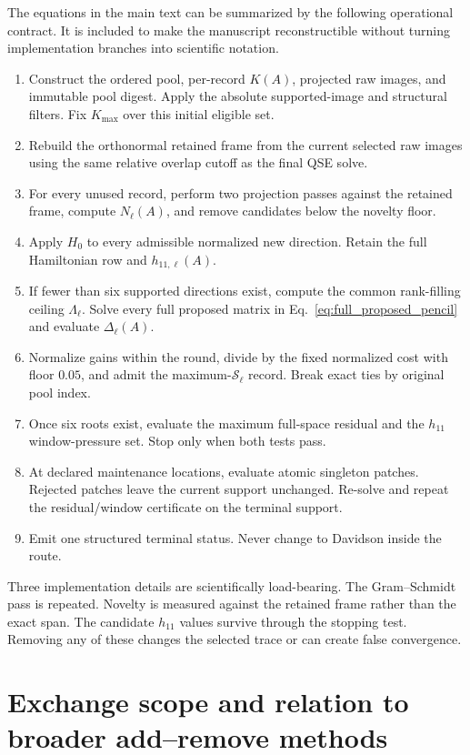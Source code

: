 \documentclass[
  reprint,
  amsmath,
  amssymb,
  aps,
  pra,
  nofootinbib,
  superscriptaddress,
  floatfix
]{revtex4-2}
\newcommand{\score}{\mathcal{S}}
\begin{document}
The equations in the main text can be summarized by the following operational
contract.  It is included to make the manuscript reconstructible without
turning implementation branches into scientific notation.

\begin{enumerate}
\item Construct the ordered pool, per-record $K(A)$, projected raw images,
and immutable pool digest.  Apply the absolute supported-image and structural
filters.  Fix $K_{\max}$ over this initial eligible set.
\item Rebuild the orthonormal retained frame from the current selected raw
images using the same relative overlap cutoff as the final QSE solve.
\item For every unused record, perform two projection passes against the
retained frame, compute $N_\ell(A)$, and remove candidates below the novelty
floor.
\item Apply $H_0$ to every admissible normalized new direction.  Retain the
full Hamiltonian row and $h_{11,\ell}(A)$.
\item If fewer than six supported directions exist, compute the common
rank-filling ceiling $\Lambda_\ell$.  Solve every full proposed matrix in
Eq.~\eqref{eq:full_proposed_pencil} and evaluate $\Delta_\ell(A)$.
\item Normalize gains within the round, divide by the fixed normalized cost
with floor $0.05$, and admit the maximum-$\score_\ell$ record.  Break exact
ties by original pool index.
\item Once six roots exist, evaluate the maximum full-space residual and the
$h_{11}$ window-pressure set.  Stop only when both tests pass.
\item At declared maintenance locations, evaluate atomic singleton patches.
Rejected patches leave the current support unchanged.  Re-solve and repeat
the residual/window certificate on the terminal support.
\item Emit one structured terminal status.  Never change to Davidson inside
the route.
\end{enumerate}

Three implementation details are scientifically load-bearing.  The
Gram--Schmidt pass is repeated.  Novelty is measured against the retained
frame rather than the exact span.  The candidate $h_{11}$ values survive
through the stopping test.  Removing any of these changes the selected trace
or can create false convergence.

\section{Exchange scope and relation to broader add--remove methods}
\label{app:exchange_scope}
\end{document}
